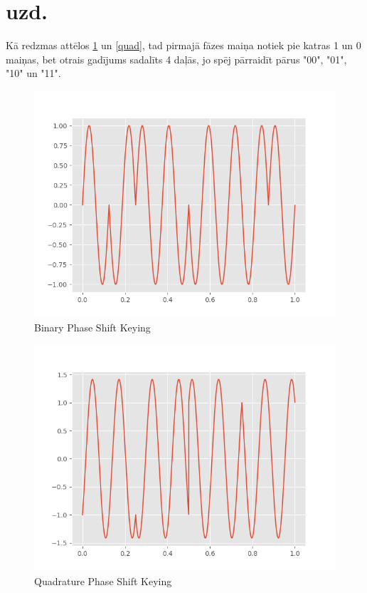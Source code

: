 \documentclass[a4paper,11pt]{article}
\begin{document}
\section{ uzd.}
Kā redzmas attēlos \ref{bin} un \ref{quad}, tad pirmajā fāzes maiņa notiek pie katras 1 un 0 maiņas, bet otrais gadījums sadalīts 4 daļās, jo spēj pārraidīt pārus "00", "01", "10" un "11".
\begin{figure}[!h]

\includegraphics[scale=0.8]{bpsk.png}
\caption{Binary Phase Shift Keying}
\label{bin}
\end{figure}

\begin{figure}[!h]

\includegraphics[scale=0.8]{qpsk.png}
\caption{Quadrature Phase Shift Keying}
\end{figure}
\label{quad}
\end{document}
